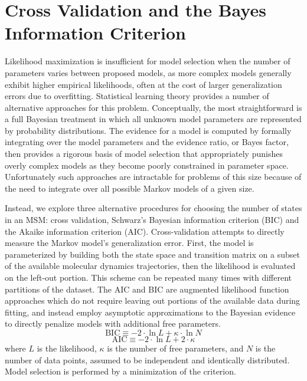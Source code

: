 \documentclass[journal=jpcbfk, layout=twocolumn, manuscript=article]{achemso}
\begin{document}
\section{Cross Validation and the Bayes Information Criterion}
Likelihood maximization is insufficient for model selection when the number of parameters varies between proposed models, as more complex models generally exhibit higher empirical likelihoods, often at the cost of larger generalization errors due to overfitting\cite{Liddle2007Information, Hastie01Elements}. Statistical learning theory provides a number of alternative approaches for this problem. Conceptually, the most straightforward is a full Bayesian treatment in which all unknown model parameters are represented by probability distributions. The evidence for a model is computed by formally integrating over the model parameters and the evidence ratio, or Bayes factor\cite{Gelfand94Bayesian}, then provides a rigorous basis of model selection that appropriately punishes overly complex models as they become poorly constrained in parameter space. Unfortunately such approaches are intractable for problems of this size because of the need to integrate over all possible Markov models of a given size.

Instead, we explore three alternative procedures for choosing the number of states in an MSM: cross validation, Schwarz's Bayesian information criterion (BIC)\cite{Schwartz78Estimating} and the Akaike information criterion (AIC)\cite{Akaike1974AIC}. Cross-validation attempts to directly measure the Markov model's generalization error. First, the model is parameterized by building both the state space and transition matrix on a subset of the available molecular dynamics trajectories, then the likelihood is evaluated on the left-out portion. This scheme can be repeated many times with different partitions of the dataset. The AIC and BIC are augmented likelihood function approaches which do not require leaving out portions of the available data during fitting, and instead employ asymptotic approximations to the Bayesian evidence to directly penalize models with additional free parameters.
\begin{equation}
\label{eq:bic}
\mathrm{BIC} \equiv -2\cdot \ln L + \kappa \cdot \ln N
\end{equation}
\begin{equation}
\label{eq:aic}
\mathrm{AIC} \equiv -2\cdot \ln L + 2 \cdot \kappa
\end{equation} where $L$ is the likelihood, $\kappa$ is the number of free parameters, and $N$ is the number of data points, assumed to be independent and identically distributed. Model selection is performed by a minimization of the criterion.
\end{document}
